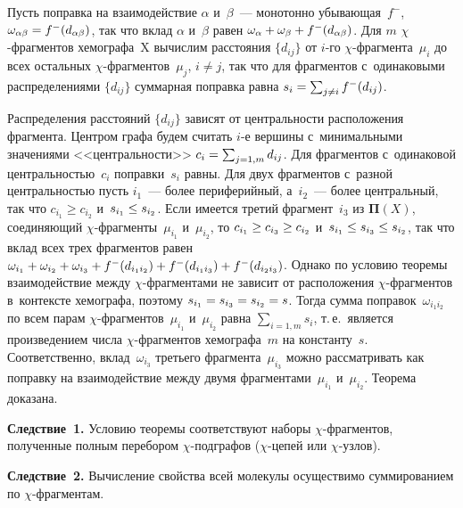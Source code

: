 \begin{multicols}{2}
     Пусть поправка на взаимодействие $\alpha$ и~$\beta$~--- монотонно 
убывающая~$f^{-}$, $\omega_{\alpha\beta}\hm= f^-(d_{\alpha\beta})$, так что 
вклад $\alpha$ и~$\beta$ равен $\omega_\alpha\hm+ \omega_\beta\hm+ f^-
(d_{\alpha\beta})$. Для $m$ $\chi$-фраг\-мен\-тов хемографа~$\mathrm{X}$ 
вычислим расстояния $\{d_{ij}\}$ от $i$-го  
$\chi$-фраг\-мен\-та~$\mu_i$ до всех остальных $\chi$-фраг\-мен\-тов~$\mu_j$, 
$i\not= j$, так что для фрагментов с~одинаковыми распределениями $\{d_{ij}\}$ 
суммарная поправка равна $s_i\hm= \sum\nolimits_{j\not= i} f^{-}(d_{ij})$.
     
     Распределения расстояний $\{d_{ij}\}$ зависят от центральности 
расположения фрагмента. Центром графа будем считать $i$-е вершины 
с~минимальными значениями <<центральности>> $c_i\hm= 
\sum\nolimits_{j=1,m} d_{ij}$. Для фрагментов с~одинаковой 
центральностью~$c_i$ поправки~$s_i$ равны. Для двух фрагментов с~разной 
центральностью пусть $i_1$~--- более периферийный, а~$i_2$~--- более 
центральный, так что $c_{i_1}\geq c_{i_2}$ и~$s_{i_1}\hm\leq s_{i_2}$. Если 
имеется третий фрагмент~$i_3$ из $\bm{\Pi}({X})$, соединяющий 
$\chi$-фраг\-мен\-ты~$\mu_{i_1}$ и~$\mu_{i_2}$, то $c_{i_1}\hm\geq 
c_{i_3}\hm\geq c_{i_2}$ и~$s_{i_1}\hm\leq s_{i_3}\hm\leq s_{i_2}$, так что 
вклад всех трех фрагментов равен $\omega_{i_1}\hm+ \omega_{i_2} \hm+ 
\omega_{i_3}+ f^-(d_{i_1i_2})\hm+ f^-(d_{i_1i_3})\hm+ f^-(d_{i_2i_3})$. Однако 
по условию теоремы взаимодействие между $\chi$-фраг\-мен\-та\-ми не зависит 
от расположения $\chi$-фраг\-мен\-тов в~контексте хемографа, поэтому 
$s_{i_1}\hm= s_{i_3}\hm= s_{i_2}\hm= s$. Тогда сумма 
поправок~$\omega_{i_1i_2}$ по всем парам $\chi$-фраг\-мен\-тов~$\mu_{i_1}$ 
и~$\mu_{i_2}$ равна $\sum\nolimits_{i=1,m} s_i$, т.\,е.\ является произведением 
числа $\chi$-фраг\-мен\-тов хемографа~$m$ на константу~$s$. Соответственно, 
вклад~$\omega_{i_3}$ третьего фрагмента~$\mu_{i_3}$ можно рассматривать 
как поправку на взаимодействие между двумя фрагментами~$\mu_{i_1}$ 
и~$\mu_{i_2}$. Тео\-ре\-ма доказана.
     
     \vspace*{2pt}
     
     
\noindent
\textbf{Следствие~1.} Условию тео\-ре\-мы соответствуют наборы  
$\chi$-фраг\-мен\-тов, полученные пол\-ным перебором $\chi$-под\-гра\-фов 
($\chi$-це\-пей или $\chi$-уз\-лов).

     \vspace*{2pt}
     
     
\noindent
\textbf{Следствие~2.} Вычисление свойства всей молекулы осуществимо 
суммированием по $\chi$-фраг\-мен\-там. 


\end{multicols}
